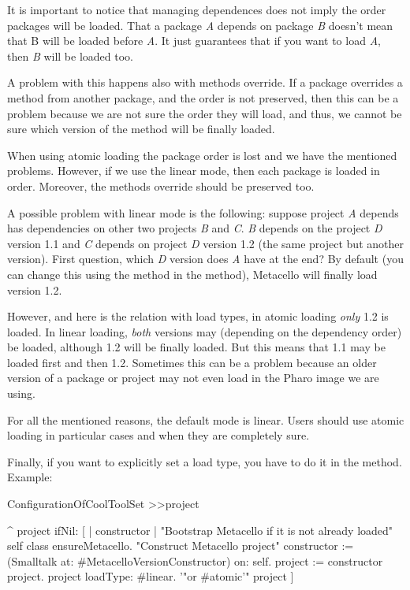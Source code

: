 \documentclass[a4paper,10pt,twoside]{book}
\begin{document}
\begin{code}{}
\begin{code}{}
It is important to notice that managing dependences does not imply the order packages will be loaded. That a package \emph{A} depends on package \emph{B} doesn't mean that B will be loaded before \emph{A}. It just guarantees that if you want to load \emph{A}, then \emph{B} will be loaded too. 

A problem with this happens also with methods override. If a package overrides a method from another package, and the order is not preserved, then this can be a problem because we are not sure the order they will load, and thus, we cannot be sure which version of the method will be finally loaded. 

When using atomic loading the package order is lost and we have the mentioned problems. However, if we use the linear mode, then each package is loaded in order. Moreover, the methods override should be preserved too. 

A possible problem with linear mode is the following: suppose project \emph{A} depends has dependencies on other two projects \emph{B} and \emph{C}. \emph{B} depends on the project \emph{D} version 1.1 and \emph{C} depends on project \emph{D} version 1.2 (the same project but another version). First question, which \emph{D} version does \emph{A} have at the end?  By default (you can change this using the method  in the  method), Metacello will finally load version 1.2.

However, and here is the relation with load types, in atomic loading \emph{only} 1.2 is loaded. In linear loading, \emph{both} versions may (depending on the dependency order) be loaded, although 1.2 will be finally loaded. But this means that 1.1 may be loaded first and then 1.2. Sometimes this can be a problem because an older version of a package or project may not even load in the Pharo image we are using. 

For all the mentioned reasons, the default mode is linear. Users should use atomic loading in particular cases and when they are completely sure. 

Finally, if you want to explicitly set a load type, you have to do it in the  method. Example:

\begin{code}{}
ConfigurationOfCoolToolSet >>project

	^ project ifNil: [ | constructor |
		"Bootstrap Metacello if it is not already loaded"
		self class ensureMetacello.
		"Construct Metacello project"
		constructor := (Smalltalk at: #MetacelloVersionConstructor) on: self.
		project := constructor project.
		project loadType: #linear. '"or #atomic'"
		project ]


\end{code}
\end{code}
\end{code}
\end{document}
